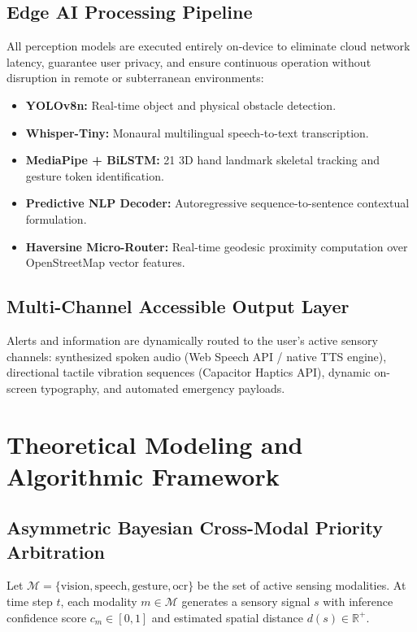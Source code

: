 \documentclass[conference]{IEEEtran}
\begin{document}
\subsection{Edge AI Processing Pipeline}
All perception models are executed entirely on-device to eliminate cloud network latency, guarantee user privacy, and ensure continuous operation without disruption in remote or subterranean environments:
\begin{itemize}
    \item \textbf{YOLOv8n:} Real-time object and physical obstacle detection.
    \item \textbf{Whisper-Tiny:} Monaural multilingual speech-to-text transcription.
    \item \textbf{MediaPipe + BiLSTM:} 21 3D hand landmark skeletal tracking and gesture token identification.
    \item \textbf{Predictive NLP Decoder:} Autoregressive sequence-to-sentence contextual formulation.
    \item \textbf{Haversine Micro-Router:} Real-time geodesic proximity computation over OpenStreetMap vector features.
\end{itemize}

\subsection{Multi-Channel Accessible Output Layer}
Alerts and information are dynamically routed to the user's active sensory channels: synthesized spoken audio (Web Speech API / native TTS engine), directional tactile vibration sequences (Capacitor Haptics API), dynamic on-screen typography, and automated emergency payloads.

\section{Theoretical Modeling and Algorithmic Framework}

\subsection{Asymmetric Bayesian Cross-Modal Priority Arbitration}
Let $\mathcal{M} = \{\text{vision}, \text{speech}, \text{gesture}, \text{ocr}\}$ be the set of active sensing modalities. At time step $t$, each modality $m \in \mathcal{M}$ generates a sensory signal $s$ with inference confidence score $c_m \in [0, 1]$ and estimated spatial distance $d(s) \in \mathbb{R}^+$.
\end{document}
